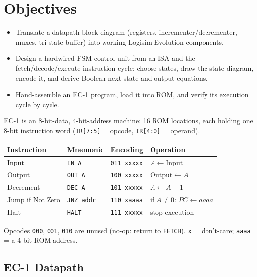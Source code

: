 \documentclass[11pt]{article}
\begin{document}
\labheader

\section*{Objectives}
\begin{itemize}[leftmargin=*,nosep]
  \item Translate a datapath block diagram (registers, incrementer/decrementer, muxes,
        tri-state buffer) into working Logisim-Evolution components.
  \item Design a hardwired FSM control unit from an ISA and the fetch/decode/execute
        instruction cycle: choose states, draw the state diagram, encode it, and derive
        Boolean next-state and output equations.
  \item Hand-assemble an EC-1 program, load it into ROM, and verify its execution cycle
        by cycle.
\end{itemize}

\begin{summary}
EC-1 is an 8-bit-data, 4-bit-address machine: 16 ROM locations, each holding one
8-bit instruction word (\texttt{IR[7:5]} = opcode, \texttt{IR[4:0]} = operand).
\begin{center}
\begin{tabular}{@{}llll@{}}
\toprule
\textbf{Instruction} & \textbf{Mnemonic} & \textbf{Encoding} & \textbf{Operation} \\
\midrule
Input        & \texttt{IN A}    & \texttt{011 xxxxx} & $A \leftarrow \text{Input}$ \\
Output       & \texttt{OUT A}   & \texttt{100 xxxxx} & $\text{Output} \leftarrow A$ \\
Decrement    & \texttt{DEC A}   & \texttt{101 xxxxx} & $A \leftarrow A - 1$ \\
Jump if Not Zero & \texttt{JNZ addr} & \texttt{110 xaaaa} & if $A \neq 0$: $PC \leftarrow aaaa$ \\
Halt         & \texttt{HALT}    & \texttt{111 xxxxx} & stop execution \\
\bottomrule
\end{tabular}
\end{center}
Opcodes \texttt{000}, \texttt{001}, \texttt{010} are unused (no-op: return to \texttt{FETCH}).
\texttt{x} = don't-care; \texttt{aaaa} = a 4-bit ROM address.
\end{summary}

\subsection*{EC-1 Datapath}
\end{document}
